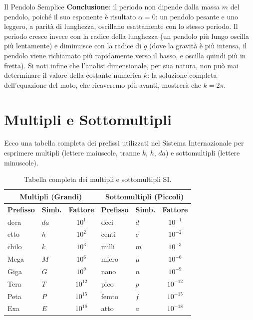 \begin{esercizio}{Il Pendolo Semplice}
\textbf{Conclusione}: il periodo non dipende dalla massa $m$ del pendolo, poiché il suo esponente è risultato $\alpha = 0$: un pendolo pesante e uno leggero, a parità di lunghezza, oscillano esattamente con lo stesso periodo. Il periodo cresce invece con la radice della lunghezza (un pendolo più lungo oscilla più lentamente) e diminuisce con la radice di $g$ (dove la gravità è più intensa, il pendolo viene richiamato più rapidamente verso il basso, e oscilla quindi più in fretta). Si noti infine che l'analisi dimensionale, per sua natura, non può mai determinare il valore della costante numerica $k$: la soluzione completa dell'equazione del moto, che ricaveremo più avanti, mostrerà che $k = 2\pi$.
\end{esercizio}

\section{Multipli e Sottomultipli}
Ecco una tabella completa dei prefissi utilizzati nel Sistema Internazionale per esprimere multipli (lettere maiuscole, tranne $k$, $h$, $da$) e sottomultipli (lettere minuscole).

\begin{table}[h]
    \centering
    \renewcommand{\arraystretch}{1.2}
    \begin{tabular}{llc | llc}
        \toprule
        \multicolumn{3}{c|}{\textbf{Multipli (Grandi)}} & \multicolumn{3}{c}{\textbf{Sottomultipli (Piccoli)}} \\
        \midrule
        \textbf{Prefisso} & \textbf{Simb.} & \textbf{Fattore} & \textbf{Prefisso} & \textbf{Simb.} & \textbf{Fattore} \\
        \midrule
        deca  & $da$ & $10^1$  & deci  & $d$ & $10^{-1}$ \\
        etto  & $h$  & $10^2$  & centi & $c$ & $10^{-2}$ \\
        chilo & $k$  & $10^3$  & milli & $m$ & $10^{-3}$ \\
        Mega  & $M$  & $10^6$  & micro & $\mu$ & $10^{-6}$ \\
        Giga  & $G$  & $10^9$  & nano  & $n$ & $10^{-9}$ \\
        Tera  & $T$  & $10^{12}$ & pico  & $p$ & $10^{-12}$ \\
        Peta  & $P$  & $10^{15}$ & femto & $f$ & $10^{-15}$ \\
        Exa   & $E$  & $10^{18}$ & atto  & $a$ & $10^{-18}$ \\
        \bottomrule
    \end{tabular}
    \caption{Tabella completa dei multipli e sottomultipli SI.}
    \label{tab:multipli}
\end{table}

